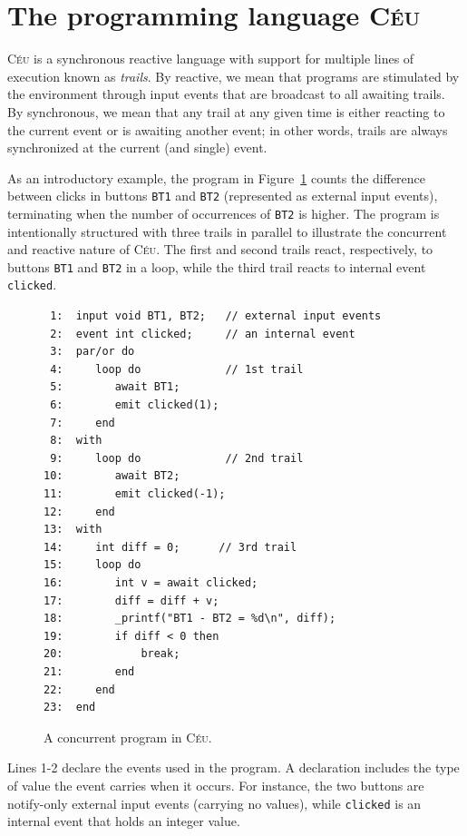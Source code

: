 \documentclass[preprint]{sigplanconf}
\newcommand{\CEU}{\textsc{C\'{e}u}\xspace}
\newcommand{\code}[1] {{\small{\texttt{#1}}}}
\newcommand{\1}{\;}
\newcommand{\2}{\;\;}
\newcommand{\3}{\;\;\;}
\newcommand{\5}{\;\;\;\;\;}
\begin{document}
\section{The programming language \CEU}
\label{sec.ceu}

\CEU is a synchronous reactive language with support for multiple lines of 
execution known as \emph{trails}.
By reactive, we mean that programs are stimulated by the environment through 
input events that are broadcast to all awaiting trails.
By synchronous, we mean that any trail at any given time is either reacting to 
the current event or is awaiting another event;
in other words, trails are always synchronized at the current (and single) 
event.

As an introductory example, the program in Figure~\ref{lst:ceu:1} counts the 
difference between clicks in buttons \code{BT1} and \code{BT2} (represented as 
external input events), terminating when the number of occurrences of 
\code{BT2} is higher.
The program is intentionally structured with three trails in parallel to 
illustrate the concurrent and reactive nature of \CEU.
The first and second trails react, respectively, to buttons \code{BT1} and 
\code{BT2} in a loop, while the third trail reacts to internal event 
\code{clicked}.

\begin{figure}[t]
{\small
\begin{verbatim}
 1:  input void BT1, BT2;   // external input events
 2:  event int clicked;     // an internal event
 3:  par/or do
 4:     loop do             // 1st trail
 5:        await BT1;
 6:        emit clicked(1);
 7:     end
 8:  with
 9:     loop do             // 2nd trail
10:        await BT2;
11:        emit clicked(-1);
12:     end
13:  with
14:     int diff = 0;      // 3rd trail
15:     loop do
16:        int v = await clicked;
17:        diff = diff + v;
18:        _printf("BT1 - BT2 = %d\n", diff);
19:        if diff < 0 then
20:            break;
21:        end
22:     end
23:  end
\end{verbatim}
}%
\caption{ A concurrent program in \CEU.
\label{lst:ceu:1}
}
\end{figure}

Lines 1-2 declare the events used in the program.
A declaration includes the type of value the event carries when it occurs.
For instance, the two buttons are notify-only external input events (carrying 
no values), while \code{clicked} is an internal event that holds an integer 
value.
\end{document}
